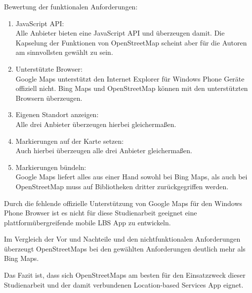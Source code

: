 Bewertung der funktionalen Anforderungen:
\begin{enumerate}
\item JavaScript API:\\
Alle Anbieter bieten eine JavaScript API und überzeugen damit. Die Kapselung der Funktionen von OpenStreetMap scheint aber für die Autoren am sinnvollsten gewählt zu sein.
\item Unterstützte Browser:\\
Google Maps unterstützt den Internet Explorer für Windows Phone Geräte offiziell nicht. Bing Maps und OpenStreetMap können mit den unterstützten Browsern überzeugen.
\item Eigenen Standort anzeigen:\\
Alle drei Anbieter überzeugen hierbei gleichermaßen.
\item Markierungen auf der Karte setzen:\\
Auch hierbei überzeugen alle drei Anbieter gleichermaßen.
\item Markierungen bündeln:\\
Google Maps liefert alles aus einer Hand sowohl bei Bing Maps, als auch bei OpenStreetMap muss auf Bibliotheken dritter zurückgegriffen werden.
\end{enumerate}

Durch die fehlende offizielle Unterstützung von Google Maps für den Windows Phone Browser ist es nicht für diese Studienarbeit geeignet eine plattformübergreifende mobile LBS App zu entwickeln.

Im Vergleich der Vor und Nachteile und den nichtfunktionalen Anforderungen überzeugt OpenStreetMaps bei den gewählten Anforderungen deutlich mehr als Bing Maps.

Das Fazit ist, dass sich OpenStreetMaps am besten für den Einsatzzweck dieser Studienarbeit und der damit verbundenen Location-based Services App eignet.